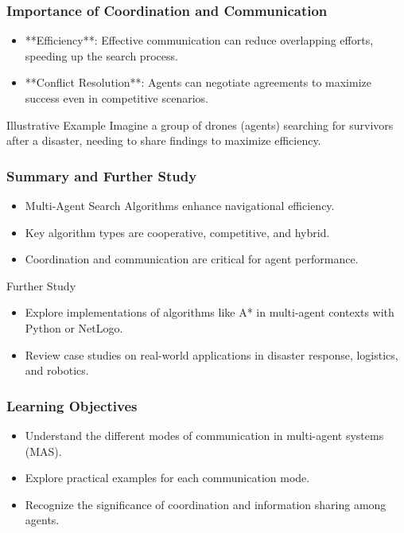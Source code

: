 \documentclass[aspectratio=169]{beamer}
\begin{document}
\begin{frame}[fragile]
    \frametitle{Importance of Coordination and Communication}
    \begin{itemize}
        \item **Efficiency**: Effective communication can reduce overlapping efforts, speeding up the search process.
        \item **Conflict Resolution**: Agents can negotiate agreements to maximize success even in competitive scenarios.
    \end{itemize}

    \begin{block}{Illustrative Example}
        Imagine a group of drones (agents) searching for survivors after a disaster, needing to share findings to maximize efficiency.
    \end{block}
\end{frame}

\begin{frame}[fragile]
    \frametitle{Summary and Further Study}
    \begin{itemize}
        \item Multi-Agent Search Algorithms enhance navigational efficiency.
        \item Key algorithm types are cooperative, competitive, and hybrid.
        \item Coordination and communication are critical for agent performance.
    \end{itemize}

    \begin{block}{Further Study}
        \begin{itemize}
            \item Explore implementations of algorithms like A* in multi-agent contexts with Python or NetLogo.
            \item Review case studies on real-world applications in disaster response, logistics, and robotics.
        \end{itemize}
    \end{block}
\end{frame}

\begin{frame}[fragile]
    \frametitle{Learning Objectives}
    \begin{itemize}
        \item Understand the different modes of communication in multi-agent systems (MAS).
        \item Explore practical examples for each communication mode.
        \item Recognize the significance of coordination and information sharing among agents.
    \end{itemize}
\end{frame}
\end{document}
